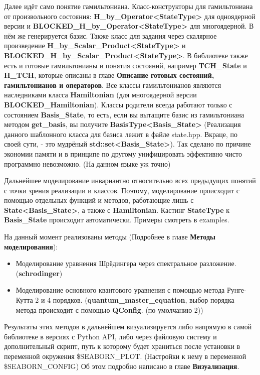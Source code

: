 \documentclass[12pt,fleqn]{article}
\begin{document}
        Далее идёт само понятие гамильтониана. Класс-конструкторы для гамильтониана от произвольного состояния: 
        \textbf{H\_by\_Operator<StateType>} для одноядерной версии и \newline
        \textbf{BLOCKED\_H\_by\_Operator<StateType>} для многоядерной. 
        В нём же генерируется базис.
        Также класс для задания через скалярное произведение \newline \textbf{H\_by\_Scalar\_Product<StateType>} и \newline \textbf{BLOCKED\_H\_by\_Scalar\_Product<StateType>}.
        В библиотеке также есть и готовые гамильтонианы и понятия состояний, например \textbf{TCH\_State} и \textbf{H\_TCH}, которые описаны
        в главе \textbf{Описание готовых состояний, гамильтонианов и операторов}.
        Все классы гамильтонианов являются наследниками класса \textbf{Hamiltonian} (для многоядерной версии \textbf{BLOCKED\_Hamiltonian}).
        Классы родители всегда работают только с состоянием \textbf{Basis\_State}, то есть, если вы вытащите базис из гамильтониана 
        методом \textbf{get\_basis}, вы получите \textbf{BasisType<Basis\_State>} (Реализация данного шаблонного класса для базиса лежит в 
        файле \textsf{state.hpp}. Вкраце, по своей сути, - это мудрёный \textbf{std::set<Basis\_State>}). Так сделано по причине экономии памяти и в принципе по другому унифицировать эффективно
        чисто программно невозможно. (На данном языке уж точно)
        
        Дальнейшее моделирование инвариантно относительно всех предыдущих понятий с точки зрения реализации и классов. Поэтому, моделирование  
        происходит с помощью отдельных функций и методов, работающие лишь с \textbf{State<Basis\_State>}, а также с \textbf{Hamiltonian}.
        Кастинг \textbf{StateType} к \textbf{Basis\_State}
        происходит автоматически. Примеры смотреть в \textsf{examples}.

        На данный момент реализованы методы (Подробнее в главе \textbf{Методы моделирования}):
            \begin{itemize}
                \item{Моделирование уравнения Шрёдингера через спектральное разложение. (\textbf{schrodinger})}
                \item{Моделирование основного квантового уравнения с помощью метода \textsf{Рунге-Кутта} 2 и 4 порядков.
                     (\textbf{quantum\_master\_equation}, выбор порядка метода происходит с помощью \textbf{QConfig}. (по умолчанию 2))}
            \end{itemize}
        Результаты этих методов в дальнейшем визуализируется либо напрямую в самой библиотеке в версиях с \textsf{Python API}, либо через файловую систему и дополнительный скрипт, путь к 
        которому будет храниться после установки в переменной окружения \textsf{\$SEABORN\_PLOT}. (Настройки к нему в переменной 
        \textsf{\$SEABORN\_CONFIG})
        Об этом подробно написано в главе \textbf{Визуализация}.
\end{document}
